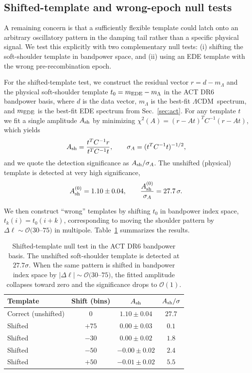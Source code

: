 \documentclass[twocolumn,showpacs,preprintnumbers,amsmath,amssymb,prd]{revtex4-2}
\newcommand{\lcdm}{$\Lambda$CDM}
\begin{document}
\subsection{Shifted-template and wrong-epoch null tests}
\label{sec:shifted_template}

A remaining concern is that a sufficiently flexible template could latch onto
an arbitrary oscillatory pattern in the damping tail rather than a specific
physical signal. We test this explicitly with two complementary null tests:
(i) shifting the soft-shoulder template in bandpower space, and
(ii) using an EDE template with the wrong pre-recombination epoch.

For the shifted-template test, we construct the residual vector
$r = d - m_\Lambda$ and the physical soft-shoulder template
$t_0 = m_{\rm EDE} - m_\Lambda$ in the ACT DR6 bandpower basis, where
$d$ is the data vector, $m_\Lambda$ is the best-fit \lcdm\ spectrum, and
$m_{\rm EDE}$ is the best-fit EDE spectrum from Sec.~\ref{sec:act}.
For any template $t$ we fit a single amplitude $A_{\rm sh}$ by minimizing
$\chi^2(A) = (r - A t)^T C^{-1} (r - A t)$, which yields
\begin{equation}
  A_{\rm sh} = \frac{t^T C^{-1} r}{t^T C^{-1} t}, \qquad
  \sigma_{A} = (t^T C^{-1} t)^{-1/2},
\end{equation}
and we quote the detection significance as $A_{\rm sh}/\sigma_{A}$.
The unshifted (physical) template is detected at very high significance,
\begin{equation}
  A_{\rm sh}^{(0)} = 1.10 \pm 0.04, \qquad
  \frac{A_{\rm sh}^{(0)}}{\sigma_{A}} = 27.7\,\sigma.
\end{equation}

We then construct ``wrong'' templates by shifting $t_0$ in bandpower index
space, $t_k(i) = t_0(i + k)$, corresponding to moving the shoulder pattern
by $\Delta\ell \sim \mathcal{O}(30$--$75)$ in multipole. Table~\ref{tab:shifted}
summarizes the results.

\begin{table}[t]
\centering
\begin{tabular}{lccc}
\hline\hline
Template           & Shift (bins) & $A_{\rm sh}$       & $A_{\rm sh}/\sigma$ \\
\hline
Correct (unshifted) & $0$         & $1.10 \pm 0.04$    & $27.7$ \\
Shifted             & $+75$       & $0.00 \pm 0.03$    & $0.1$ \\
Shifted             & $-30$       & $0.00 \pm 0.02$    & $1.8$ \\
Shifted             & $-50$       & $-0.00 \pm 0.02$   & $2.4$ \\
Shifted             & $+50$       & $-0.01 \pm 0.02$   & $5.5$ \\
\hline\hline
\end{tabular}
\caption{Shifted-template null test in the ACT DR6 bandpower basis. The
unshifted soft-shoulder template is detected at $27.7\sigma$. When the
same pattern is shifted in bandpower index space by $|\Delta\ell| \sim
\mathcal{O}(30$--$75)$, the fitted amplitude collapses toward zero and
the significance drops to $\mathcal{O}(1)$.}
\label{tab:shifted}
\end{table}
\end{document}
